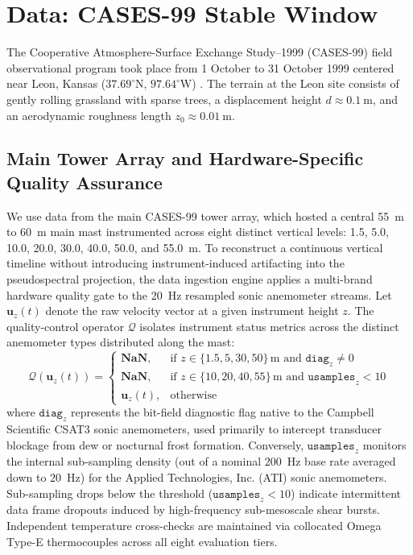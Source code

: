 \documentclass[11pt,a4paper]{article}
\begin{document}
\section{Data: CASES-99 Stable Window}
\label{sec:data}

The Cooperative Atmosphere-Surface Exchange Study--1999 (CASES-99) field observational program took place from 1 October to 31 October 1999 centered near Leon, Kansas ($37.69^\circ\text{N}$, $97.64^\circ\text{W}$) \citep{Poulos2002}. The terrain at the Leon site consists of gently rolling grassland with sparse trees, a displacement height $d \approx \SI{0.1}{\meter}$, and an aerodynamic roughness length $z_0 \approx \SI{0.01}{\meter}$.

\subsection{Main Tower Array and Hardware-Specific Quality Assurance}
We use data from the main CASES-99 tower array, which hosted a central \SI{55}{\meter} to \SI{60}{\meter} main mast instrumented across eight distinct vertical levels: 1.5, 5.0, 10.0, 20.0, 30.0, 40.0, 50.0, and \SI{55.0}{\meter}. To reconstruct a continuous vertical timeline without introducing instrument-induced artifacting into the pseudospectral projection, the data ingestion engine applies a multi-brand hardware quality gate to the 20~Hz resampled sonic anemometer streams. Let $\mathbf{u}_z(t)$ denote the raw velocity vector at a given instrument height $z$. The quality-control operator $\mathcal{Q}$ isolates instrument status metrics across the distinct anemometer types distributed along the mast:
\begin{equation}
\mathcal{Q}\left(\mathbf{u}_z(t)\right) =
\begin{cases}
\mathbf{NaN}, & \text{if } z \in \{1.5, 5, 30, 50\}\,\text{m and } \mathtt{diag}_z \neq 0 \\
\mathbf{NaN}, & \text{if } z \in \{10, 20, 40, 55\}\,\text{m and } \mathtt{usamples}_z < 10 \\
\mathbf{u}_z(t), & \text{otherwise}
\end{cases}
\end{equation}
where $\mathtt{diag}_z$ represents the bit-field diagnostic flag native to the Campbell Scientific CSAT3 sonic anemometers, used primarily to intercept transducer blockage from dew or nocturnal frost formation. Conversely, $\mathtt{usamples}_z$ monitors the internal sub-sampling density (out of a nominal 200~Hz base rate averaged down to 20~Hz) for the Applied Technologies, Inc. (ATI) sonic anemometers. Sub-sampling drops below the threshold ($\mathtt{usamples}_z < 10$) indicate intermittent data frame dropouts induced by high-frequency sub-mesoscale shear bursts. Independent temperature cross-checks are maintained via collocated Omega Type-E thermocouples across all eight evaluation tiers.
\end{document}
